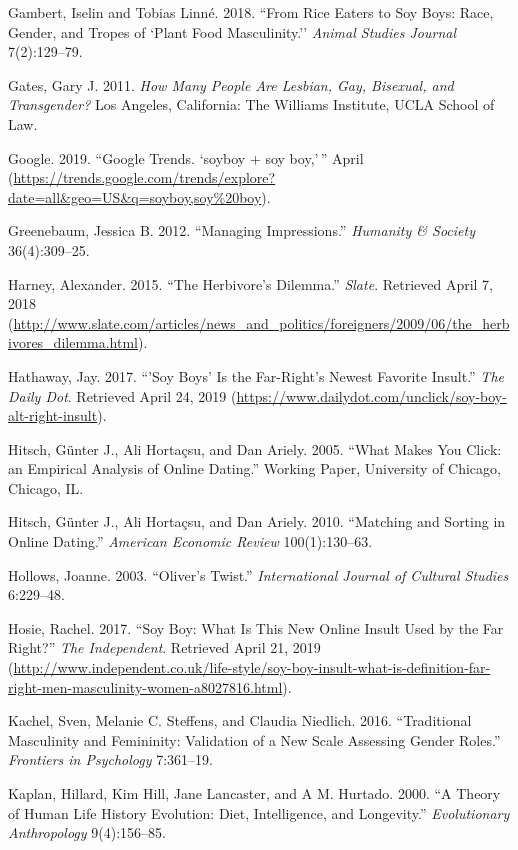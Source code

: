 \documentclass[twoside]{report}
\begin{document}
\begin{multicols*}{2}
\hypertarget{gambert}{Gambert, Iselin and Tobias Linné. 2018. ``From Rice Eaters to Soy Boys:
Race, Gender, and Tropes of `Plant Food Masculinity.'' \emph{Animal
Studies Journal} 7(2):129--79.}

\hypertarget{gates}{Gates, Gary J. 2011. \emph{How Many People Are Lesbian, Gay, Bisexual,
and Transgender?} Los Angeles, California: The Williams Institute, UCLA
School of Law.}

\hypertarget{google}{Google. 2019. ``Google Trends. `soyboy + soy boy,'\,'' April
(\url{https://trends.google.com/trends/explore?date=all\&geo=US\&q=soyboy,soy\%20boy}).}

\hypertarget{greenebaum}{Greenebaum, Jessica B. 2012. ``Managing Impressions.'' \emph{Humanity \&
Society} 36(4):309--25.}

\hypertarget{harney}{Harney, Alexander. 2015. ``The Herbivore's Dilemma.'' \emph{Slate}.
Retrieved April 7, 2018
(\url{http://www.slate.com/articles/news_and_politics/foreigners/2009/06/the_herbivores_dilemma.html}).}

\hypertarget{hathaway}{Hathaway, Jay. 2017. ``'Soy Boys' Is the Far-Right's Newest Favorite
Insult.'' \emph{The Daily Dot}. Retrieved April 24, 2019
(\url{https://www.dailydot.com/unclick/soy-boy-alt-right-insult}).}

\hypertarget{hitsch1}{Hitsch, Günter J., Ali Hortaçsu, and Dan Ariely. 2005. ``What Makes You Click: an Empirical Analysis of Online Dating.'' Working Paper, University of Chicago, Chicago, IL.}

\hypertarget{hitsch2}{Hitsch, Günter J., Ali Hortaçsu, and Dan Ariely. 2010. ``Matching and
Sorting in Online Dating.'' \emph{American Economic Review}
100(1):130--63.}

\hypertarget{hollows}{Hollows, Joanne. 2003. ``Oliver's Twist.'' \emph{International Journal
of Cultural Studies} 6:229--48.}

\hypertarget{hosie}{Hosie, Rachel. 2017. ``Soy Boy: What Is This New Online Insult Used by
the Far Right?'' \emph{The Independent}. Retrieved April 21, 2019
(\url{http://www.independent.co.uk/life-style/soy-boy-insult-what-is-definition-far-right-men-masculinity-women-a8027816.html}).}

\hypertarget{kachel}{Kachel, Sven, Melanie C. Steffens, and Claudia Niedlich. 2016.
``Traditional Masculinity and Femininity: Validation of a New Scale
Assessing Gender Roles.'' \emph{Frontiers in Psychology} 7:361--19.}

\hypertarget{kaplan}{Kaplan, Hillard, Kim Hill, Jane Lancaster, and A M. Hurtado. 2000. ``A
Theory of Human Life History Evolution: Diet, Intelligence, and
Longevity.'' \emph{Evolutionary Anthropology} 9(4):156--85.}


\end{multicols*}
\end{document}
